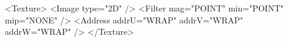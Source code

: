 <Texture>
    <Image type="2D" />
    <Filter mag="POINT" min="POINT" mip="NONE" />
    <Address addrU="WRAP" addrV="WRAP" addrW="WRAP" />
</Texture>

